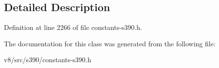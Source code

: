 \subsection{Detailed Description}


Definition at line 2266 of file constants-\/s390.\+h.



The documentation for this class was generated from the following file\+:\begin{DoxyCompactItemize}
\item 
v8/src/s390/constants-\/s390.\+h\end{DoxyCompactItemize}
